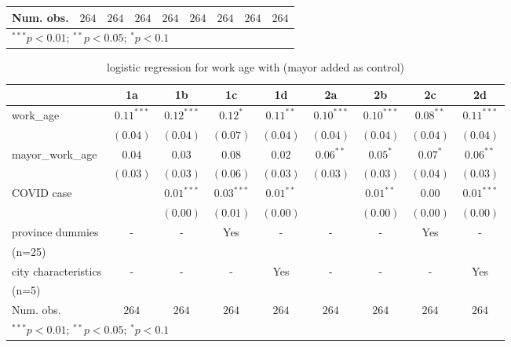 \documentclass{article}
\begin{document}
\begin{CJK}{UTF8}{gbsn}
\begin{table}[H]
\begin{center}
\begin{tabular}{l c c c c c c c c}
\hline
Num. obs.      & $264$        & $264$        & $264$        & $264$       & $264$      & $264$       & $264$     & $264$        \\
\hline
\multicolumn{9}{l}{\scriptsize{$^{***}p<0.01$; $^{**}p<0.05$; $^{*}p<0.1$}}
\end{tabular}
\label{Table 1}
\end{center}
\end{table}
\begin{table}[H]
\caption{logistic regression for work age with (mayor added as control)}
\begin{center}
\begin{tabular}{l c c c c c c c c}
\hline
 & 1a & 1b & 1c & 1d & 2a & 2b & 2c & 2d \\
\hline
work\_age        & $0.11^{***}$ & $0.12^{***}$ & $0.12^{*}$   & $0.11^{**}$ & $0.10^{***}$ & $0.10^{***}$ & $0.08^{**}$ & $0.11^{***}$ \\
                 & $(0.04)$     & $(0.04)$     & $(0.07)$     & $(0.04)$    & $(0.04)$     & $(0.04)$     & $(0.04)$    & $(0.04)$     \\
mayor\_work\_age & $0.04$       & $0.03$       & $0.08$       & $0.02$      & $0.06^{**}$  & $0.05^{*}$   & $0.07^{*}$  & $0.06^{**}$  \\
                 & $(0.03)$     & $(0.03)$     & $(0.06)$     & $(0.03)$    & $(0.03)$     & $(0.03)$     & $(0.04)$    & $(0.03)$     \\
COVID case       &              & $0.01^{***}$ & $0.03^{***}$ & $0.01^{**}$ &              & $0.01^{**}$  & $0.00$      & $0.01^{***}$ \\
                 &              & $(0.00)$     & $(0.01)$     & $(0.00)$    &              & $(0.00)$     & $(0.00)$    & $(0.00)$     \\
province dummies &-&-&Yes&-&-&-&Yes&- \\
(n=25)\\
city characteristics &-&-&-&Yes&-&-&-&Yes \\
(n=5)\\
\hline
Num. obs.        & $264$        & $264$        & $264$        & $264$       & $264$        & $264$        & $264$       & $264$        \\
\hline
\multicolumn{9}{l}{\scriptsize{$^{***}p<0.01$; $^{**}p<0.05$; $^{*}p<0.1$}}
\end{tabular}
\label{Table 1}
\end{center}
\end{table}









\end{CJK}
\end{document}
